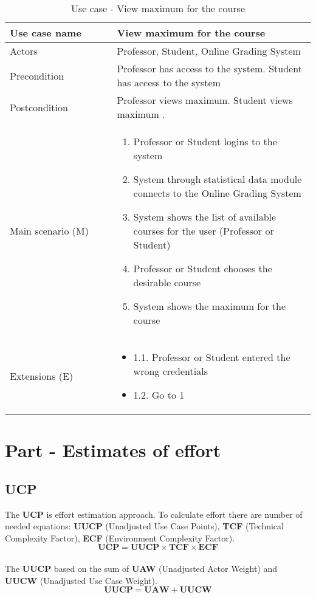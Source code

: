 \documentclass[12pt]{article}
\newcommand\tabularhead[1]{
\begin{table}[h]
  \caption{Use case - #1}
  \begin{tabular}{|p{0.35\linewidth}|p{0.65\linewidth}|}
    \hline
    \textbf{Use case name} & \textbf{#1} \\
    \hline}
\newcommand\addrow[2]{#1 &#2\\ \hline}
\newcommand\adddoublerow[2]{\begin{minipage}[t][][t]{2.5cm}#1\end{minipage}%
    &\begin{minipage}[t][][t]{\linewidth}
     \begin{itemize}\setlength{\itemsep}{0pt}%
        #2     
     \end{itemize}
     \end{minipage}\\ \hline}
\newcommand\addmulrow[2]{ \begin{minipage}[t][][t]{2.5cm}#1\end{minipage}%
     &\begin{minipage}[t][][t]{\linewidth}
      \begin{enumerate}\setlength{\itemsep}{0pt}%
        #2   
      \end{enumerate}
      \end{minipage}\\ \hline}
\newenvironment{usecase}{\tabularhead}
{\hline\end{tabular}\end{table}}
\begin{document}
\begin{usecase}{View maximum for the course}
    \addrow{Actors}{Professor, Student, Online Grading System}
    \addrow{Precondition}{Professor has access to the system. Student has access to the system}
    \addrow{Postcondition}{Professor views maximum. Student views maximum .}
    \addmulrow{Main scenario (M)}{
        \item Professor or Student logins to the system
        \item System through statistical data module connects to the Online Grading System
        \item System shows the list of available courses for the user (Professor or Student)
        \item Professor or Student chooses the desirable course
        \item System shows the maximum for the course
    }
    \adddoublerow{Extensions (E)}{
        \item[] 1.1. Professor or Student entered the wrong credentials
        \item[] 1.2. Go to 1
    }
\end{usecase}
\section{Part - Estimates of effort}
\subsection{UCP}
The \textbf{UCP} is effort estimation approach. To calculate effort there are number of needed equations: \textbf{UUCP} (Unadjusted Use Case Points), \textbf{TCF} (Technical Complexity Factor), \textbf{ECF} (Environment Complexity Factor). \\
\begin{equation}
    \textbf{UCP} = \textbf{UUCP} \times \textbf{TCF} \times \textbf{ECF}
\end{equation}\\

The \textbf{UUCP} based on the sum of \textbf{UAW} (Unadjusted Actor Weight)
and \textbf{UUCW} (Unadjusted Use Case Weight).\\
\begin{equation}
    \textbf{UUCP} = \textbf{UAW} + \textbf{UUCW}
\end{equation}\\
\end{document}

